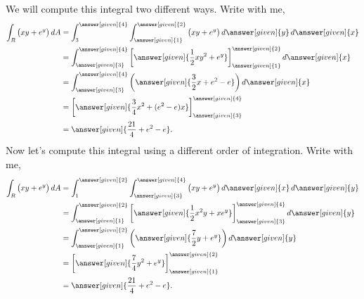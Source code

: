 \documentclass{ximera}
\begin{document}
\begin{example}
\begin{image}
  \end{image}
  \begin{explanation}
    We will compute this integral two different ways. Write with me,
    \begin{align*}
      \int_R \big(xy+e^y\big) \d A &= \int_3^{\answer[given]{4}}\int_{\answer[given]{1}}^{\answer[given]{2}}\big(xy+e^y\big) \d \answer[given]{y} \d \answer[given]{x}\\
      &= \int_{\answer[given]{3}}^{\answer[given]{4}} \eval{\answer[given]{\frac{1}{2}xy^2+e^y}}_{\answer[given]{1}}^{\answer[given]{2}} \d \answer[given]{x} \\
      &= \int_{\answer[given]{3}}^{\answer[given]{4}}\left(\answer[given]{\frac{3}{2}x + e^2-e}\right)\d \answer[given]{x} \\
      &= \eval{\answer[given]{\frac{3}{4}x^2 + (e^2-e)x}}_{\answer[given]{3}}^{\answer[given]{4}} \\
      &= \answer[given]{\frac{21}{4}+ e^2-e}.
    \end{align*}
  Now let's compute this integral using a different order of
  integration. Write with me,
  \begin{align*}
    \int_R\big(xy+e^y\big) \d A &= \int_1^{\answer[given]{2}}\int_{\answer[given]{3}}^{\answer[given]{4}}\big(xy+e^y\big)\d \answer[given]{x} \d \answer[given]{y} \\
    &= \int_{\answer[given]{1}}^{\answer[given]{2}}\eval{\answer[given]{\frac{1}{2}x^2y+xe^y}}_{\answer[given]{3}}^{\answer[given]{4}}\d \answer[given]{y}\\
    &= \int_{\answer[given]{1}}^{\answer[given]{2}}\left(\answer[given]{\frac{7}{2}y+e^y}\right)\d \answer[given]{y}\\
    &= \eval{\answer[given]{\frac{7}{4}y^2+e^y}}_{\answer[given]{1}}^{\answer[given]{2}}\\
    &=\answer[given]{\frac{21}{4}+e^2-e}.
  \end{align*}
  \end{explanation}
\end{example}
\end{document}

